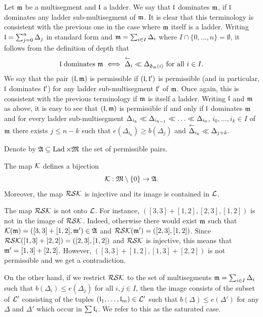 \documentclass{ert-l} %
\begin{document}
Let $\mathfrak{m}$ be a multisegment and $\mathfrak{l}$ a ladder.
We say that $\mathfrak{l}$ dominates $\mathfrak{m}$, if $\mathfrak{l}$ dominates any
ladder sub-multisegment of $\mathfrak{m}$. It is clear that this terminology is consistent with the previous one
in the case where $\mathfrak{m}$ itself is a ladder.
Writing $\mathfrak{l}=\sum_{j=0}^n\Delta_j$ in standard form and $\mathfrak{m}=\sum_{i\in I}\Delta_i$ where $I\cap\{0,\dots,n\}=\emptyset$,
it follows from the definition of depth that
\begin{equation} \label{eq: dom}
\text{$\la$ dominates $\m$ $\iff$
$\lshft\Delta_i\smlr\Delta_{\depth_{\m}(i)}$ for all $i\in I$.}
\end{equation}
We say that the pair $(\mathfrak{l},\mathfrak{m})$ is permissible
if $(\mathfrak{l},\mathfrak{l}')$ is permissible (and in particular, $\mathfrak{l}$ dominates $\mathfrak{l}'$) for any ladder sub-multisegment $\mathfrak{l}'$ of $\mathfrak{m}$.
Once again, this is consistent with the previous terminology if $\mathfrak{m}$ is itself a ladder.
Writing $\mathfrak{l}$ and $\mathfrak{m}$ as above, it is easy to see that $(\mathfrak{l},\mathfrak{m})$ is permissible if and only if $\mathfrak{l}$ dominates $\mathfrak{m}$
and for every ladder sub-multisegment $\Delta_{i_k}\smlr\Delta_{i_{k-1}}\smlr\dots\smlr\Delta_{i_0}$, $i_0,\dots,i_k\in I$ of $\mathfrak{m}$
there exists $j\le n-k$ such that $e(\Delta_{i_0})\ge b(\Delta_j)$ and $\lshft\Delta_{i_k}\smlr\Delta_{j+k}$.

Denote by $\mathfrak{A}\subseteq \operatorname{Lad} \times \mathfrak{M}$ the set of permissible pairs.


\begin{proposition} \label{prop: imgRSK}
The map $\mathcal{K}$ defines a bijection
\[
\mathcal{K}:\mathfrak{M}\setminus\{0\} \rightarrow\mathfrak{A}.
\]
Moreover, the map $\mathcal{RSK}$ is injective and its image is contained in $\mathcal{L}$.
\end{proposition}

\begin{remark} \label{rem: imrsk}
The map $\mathcal{RSK}$ is not onto $\mathcal{L}$.
For instance, $([3,3]+[1,2],[2,3],[1,2])$ is not in the image of $\mathcal{RSK}$.
Indeed, otherwise there would exist $\mathfrak{m}$ such that $\mathcal{K}(\mathfrak{m})=([3,3]+[1,2],\mathfrak{m}')\in\mathfrak{A}$ and
$\mathcal{RSK}(\mathfrak{m}')=([2,3],[1,2])$.
Since $\mathcal{RSK}([1,3]+[2,2])=([2,3],[1,2])$ and $\mathcal{RSK}$ is injective, this means that $\mathfrak{m}'=[1,3]+[2,2]$.
However, $([3,3]+[1,2],[1,3]+[2,2])$ is not permissible and we get a contradiction.

On the other hand, if we restrict $\mathcal{RSK}$ to the set of multisegments $\mathfrak{m}=\sum_{i\in I}\Delta_i$ such that $b(\Delta_i)\le e(\Delta_j)$ for all $i,j\in I$, then
the image consists of the subset of $\mathcal{L}'$ consisting of the tuples $(\mathfrak{l}_1,\dots,\mathfrak{l}_m)\in \mathcal{L}'$
such that $b(\Delta)\le e(\Delta')$ for any $\Delta$ and $\Delta'$ which occur in $\sum\mathfrak{l}_i$. We refer to this as the saturated case.
\end{remark}
\end{document}
